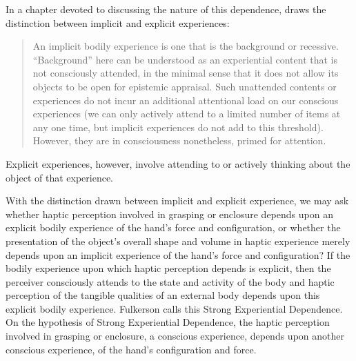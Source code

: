 In a chapter devoted to discussing the nature of this dependence, \citet[chapter 4.6]{Fulkerson:2014ek} draws the distinction between implicit and explicit experiences:
\begin{quote}
	An implicit bodily experience is one that is the background or recessive. ``Background'' here can be understood as an experiential content that is not consciously attended, in the minimal sense that it does not allow its objects to be open for epistemic appraisal. Such unattended contents or experiences do not incur an additional attentional load on our conscious experiences (we can only actively attend to a limited number of items at any one time, but implicit experiences do not add to this threshold). However, they are in consciousness nonetheless, primed for attention. \citep[90]{Fulkerson:2014ek}
\end{quote}
Explicit experiences, however, involve attending to or actively thinking about the object of that experience. 

With the distinction drawn between implicit and explicit experience, we may ask whether haptic perception involved in grasping or enclosure depends upon an explicit bodily experience of the hand's force and configuration, or whether the presentation of the object's overall shape and volume in haptic experience merely depends upon an implicit experience of the hand's force and configuration? If the bodily experience upon which haptic perception depends is explicit, then the perceiver consciously attends to the state and activity of the body and haptic perception of the tangible qualities of an external body depends upon this explicit bodily experience. Fulkerson calls this Strong Experiential Dependence. On the hypothesis of Strong Experiential Dependence, the haptic perception involved in grasping or enclosure, a conscious experience, depends upon another conscious experience, of the hand's configuration and force.

